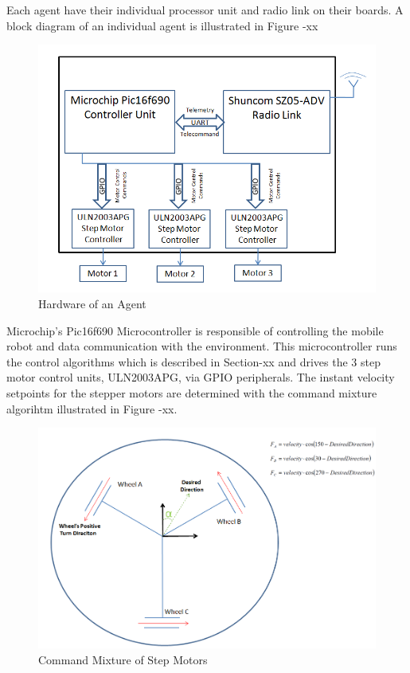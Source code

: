 \documentclass[twoside]{article}
\begin{document}
		Each agent have their individual processor unit and radio link on their boards. A block diagram of an individual agent is illustrated in Figure -xx 
		
		\begin{figure}[H]
			\caption{Hardware of an Agent}
			\centerline{\includegraphics[scale = 0.70]{agent}}
		\end{figure} 
		
		Microchip's Pic16f690 Microcontroller is responsible of controlling the mobile robot and data communication with the environment. This microcontroller runs the control algorithms which is described in Section-xx and drives the 3 step motor control units, ULN2003APG, via GPIO peripherals. The instant velocity setpoints for the stepper motors  are determined with the command mixture algorihtm illustrated in Figure -xx.
		
			\begin{figure}[H]
				\caption{Command Mixture of Step Motors}
				\centerline{\includegraphics[scale = 0.70]{ccmb}}
			\end{figure} 
\end{document}

